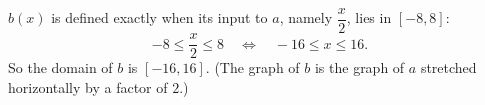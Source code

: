 $b(x)$ is defined exactly when its input to $a$, namely $\dfrac {x}{2}$, lies in $[-8,8]$:
\[
-8\le\dfrac {x}{2}\le8\quad\Longleftrightarrow\quad-16\le x\le16 .
\]
So the domain of $b$ is $\boxed{[-16,16]}$. (The graph of $b$ is the graph of $a$ stretched horizontally by a factor of $2$.)

